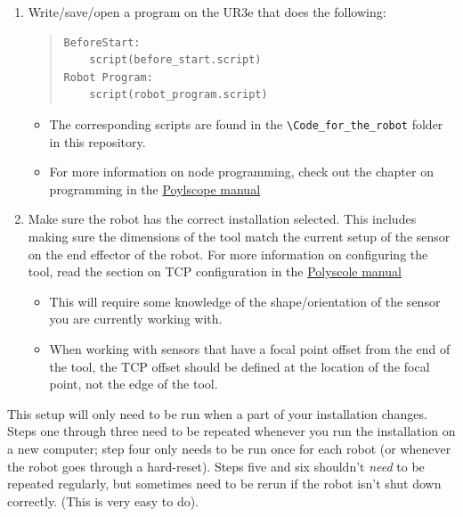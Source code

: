 \documentclass[11pt]{article}
\begin{document}
\begin{enumerate}
\begin{itemize}
    \end{itemize}
    \item Write/save/open a program on the UR3e that does the following:
        \begin{quote}
\begin{verbatim}
BeforeStart:
    script(before_start.script)
Robot Program:
    script(robot_program.script)        
\end{verbatim}
        \end{quote}
    \begin{itemize}
        \item The corresponding scripts are found in the \texttt{\textbackslash{}Code\_for\_the\_robot} folder in this repository.
        \item For more information on node programming, check out the chapter on programming in the \hyperlink{https://s3-eu-west-1.amazonaws.com/ur-support-site/44018/Software_Manual_en_Global.pdf\#page=60}{Poylscope manual} 
    \end{itemize}
    \item Make sure the robot has the correct installation selected. This includes making sure the dimensions of the tool match the current setup of the sensor on the end effector of the robot. For more information on configuring the tool, read the section on TCP configuration in the \hyperlink{https://s3-eu-west-1.amazonaws.com/ur-support-site/44018/Software_Manual_en_Global.pdf\#page=73}{Polyscole manual}
    \begin{itemize}
        \item This will require some knowledge of the shape/orientation of the sensor you are currently working with.
        \item When working with sensors that have a focal point offset from the end of the tool, the TCP offset should be defined at the location of the focal point, not the edge of the tool.
    \end{itemize}
\end{enumerate}
This setup will only need to be run when a part of your installation changes. Steps one through three need to be repeated whenever you run the installation on a new computer; step four only needs to be run once for each robot (or whenever the robot goes through a hard-reset).
Steps five and six shouldn't \textit{need} to be repeated regularly, but sometimes need to be rerun if the robot isn't shut down correctly. (This is very easy to do).
\end{document}
